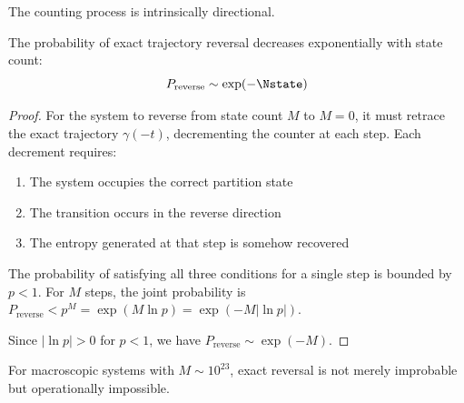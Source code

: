 The counting process is intrinsically directional.

\begin{theorem}
\label{thm:irreversibility}
The probability of exact trajectory reversal decreases exponentially with state count:
\begin{equation}
    P_{\mathrm{reverse}} \sim \exp(-\Nstate)
\end{equation}
\end{theorem}

\begin{proof}
For the system to reverse from state count $M$ to $M = 0$, it must retrace the exact trajectory $\gamma(-t)$, decrementing the counter at each step. Each decrement requires:
\begin{enumerate}
    \item[(i)] The system occupies the correct partition state
    \item[(ii)] The transition occurs in the reverse direction
    \item[(iii)] The entropy generated at that step is somehow recovered
\end{enumerate}

The probability of satisfying all three conditions for a single step is bounded by $p < 1$. For $M$ steps, the joint probability is $P_{\mathrm{reverse}} < p^M = \exp(M \ln p) = \exp(-M |\ln p|)$.

Since $|\ln p| > 0$ for $p < 1$, we have $P_{\mathrm{reverse}} \sim \exp(-M)$.
\end{proof}

For macroscopic systems with $M \sim 10^{23}$, exact reversal is not merely improbable but operationally impossible.

